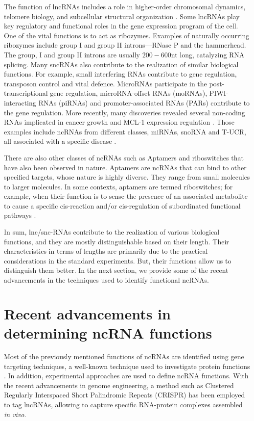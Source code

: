 The function of lncRNAs includes a role in higher-order chromosomal dynamics, telomere biology, and subcellular structural organization \cite{bergmann2014long,cusanelli2014telomeric}. Some lncRNAs play key regulatory and functional roles in the gene expression program of the cell. One of the vital functions is to act as ribozymes. Examples of naturally occurring ribozymes include group I and group II introns---RNase P and the hammerhead. The group, I and group II introns are usually $200-600$nt long, catalyzing RNA splicing. Many sncRNAs also contribute to the realization of similar biological functions. For example, small interfering RNAs contribute to gene regulation, transposon control and vital defence. MicroRNAs participate in the post-transcriptional gene regulation, microRNA-offset RNAs (moRNAs), PIWI-interacting RNAs (piRNAs) and promoter-associated RNAs (PARs) contribute to the gene regulation. More recently,  many discoveries revealed several non-coding RNAs implicated in cancer growth and MCL-1 expression regulation \cite{wang2021circpvt1, santosh2015non}. Those examples include ncRNAs from different classes, miRNAs, snoRNA and T-UCR, all associated with a specific disease \cite{santosh2015non,esteller2011non}. 

There are also other classes of ncRNAs such as Aptamers and riboswitches that have also been observed in nature. Aptamers are ncRNAs that can bind to other specified targets, whose nature is highly diverse. They range from small molecules to larger molecules. In some contexts, aptamers are termed riboswitches; for example, when their function is to sense the presence of an associated metabolite to cause a specific cis-reaction and/or cis-regulation of subordinated functional pathways \cite{winkler2003genetic}. 

In sum, lnc/snc-RNAs contribute to the realization of various biological functions, and they are mostly distinguishable based on their length. Their characteristics in terms of lengths are primarily due to the practical considerations in the standard experiments. But, their functions allow us to distinguish them better. In the next section, we provide some of the recent advancements in the techniques used to identify functional ncRNAs.

\section{Recent advancements in determining ncRNA functions}

Most of the previously mentioned functions of ncRNAs are identified using gene targeting techniques, a well-known technique used to investigate protein functions \cite{sauvageau2013multiple}. In addition, experimental approaches are used to define ncRNA functions. With the recent advancements in genome engineering, a method such as Clustered Regularly Interspaced Short Palindromic Repeats (CRISPR) has been employed to tag lncRNAs, allowing to capture specific RNA-protein complexes assembled \textit{in vivo}. 

